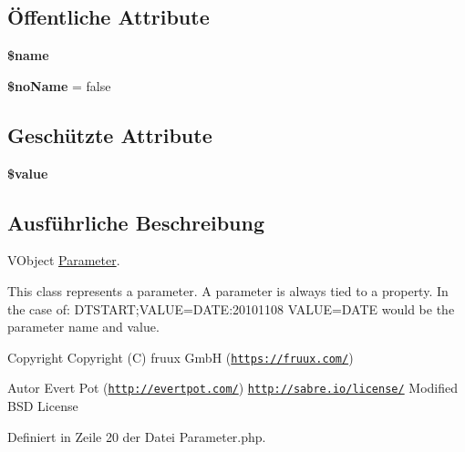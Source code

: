 \subsection*{Öffentliche Attribute}
\begin{DoxyCompactItemize}
\item 
\mbox{\label{class_sabre_1_1_v_object_1_1_parameter_a5100c0047dc51dda0f8d6c7b94a70b6f}} 
{\bfseries \$name}
\item 
\mbox{\label{class_sabre_1_1_v_object_1_1_parameter_a9f524b3350c898611377b4e2b48b1846}} 
{\bfseries \$no\+Name} = false
\end{DoxyCompactItemize}
\subsection*{Geschützte Attribute}
\begin{DoxyCompactItemize}
\item 
\mbox{\label{class_sabre_1_1_v_object_1_1_parameter_adf38a208478a6ae100727a76d5780be9}} 
{\bfseries \$value}
\end{DoxyCompactItemize}


\subsection{Ausführliche Beschreibung}
V\+Object \mbox{\hyperlink{class_sabre_1_1_v_object_1_1_parameter}{Parameter}}.

This class represents a parameter. A parameter is always tied to a property. In the case of\+: D\+T\+S\+T\+A\+RT;V\+A\+L\+UE=D\+A\+TE\+:20101108 V\+A\+L\+UE=D\+A\+TE would be the parameter name and value.

\begin{DoxyCopyright}{Copyright}
Copyright (C) fruux GmbH (\href{https://fruux.com/}{\tt https\+://fruux.\+com/}) 
\end{DoxyCopyright}
\begin{DoxyAuthor}{Autor}
Evert Pot (\href{http://evertpot.com/}{\tt http\+://evertpot.\+com/})  \href{http://sabre.io/license/}{\tt http\+://sabre.\+io/license/} Modified B\+SD License 
\end{DoxyAuthor}


Definiert in Zeile 20 der Datei Parameter.\+php.



